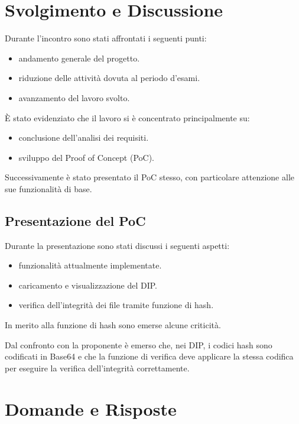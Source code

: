 \documentclass[a4paper,12pt]{article}
\begin{document}
\vspace{0.5cm}

\section{Svolgimento e Discussione}

Durante l’incontro sono stati affrontati i seguenti punti:
\begin{itemize}
    \item andamento generale del progetto.
    \item riduzione delle attività dovuta al periodo d’esami.
    \item avanzamento del lavoro svolto.
\end{itemize}

È stato evidenziato che il lavoro si è concentrato principalmente su:
\begin{itemize}
    \item conclusione dell’analisi dei requisiti.
    \item sviluppo del Proof of Concept (PoC).
\end{itemize}

Successivamente è stato presentato il PoC stesso, con particolare attenzione alle sue funzionalità di base.

\subsection{Presentazione del PoC}

Durante la presentazione sono stati discussi i seguenti aspetti:
\begin{itemize}
    \item funzionalità attualmente implementate.
    \item caricamento e visualizzazione del DIP.
    \item verifica dell’integrità dei file tramite funzione di hash.
\end{itemize}

\vspace{.3cm}

In merito alla funzione di hash sono emerse alcune criticità. 


Dal confronto con la proponente è emerso che, nei DIP, i codici hash sono codificati in Base64 e che la funzione di verifica 
deve applicare la stessa codifica per eseguire la verifica dell'integrità correttamente.

\section{Domande e Risposte}
\end{document}
